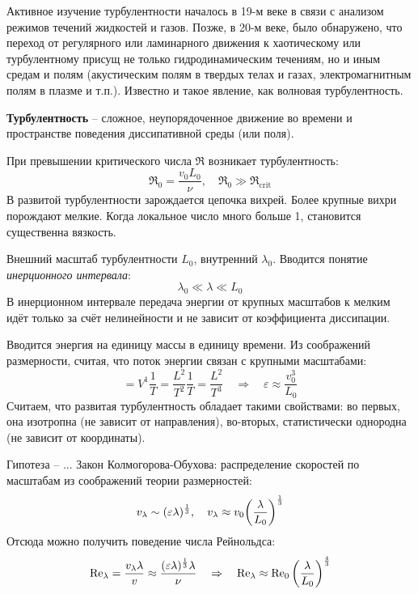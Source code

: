Активное изучение турбулентности началось в 19-м веке в связи с анализом режимов течений жидкостей и газов. Позже, в 20-м веке, было обнаружено, что переход от регулярного или ламинарного движения к хаотическому или турбулентному присущ не только гидродинамическим течениям, но и иным средам и полям (акустическим полям в твердых телах и газах, электромагнитным полям в плазме и т.п.). Известно и такое явление, как волновая турбулентность.

\textbf{Турбулентность} -- сложное, неупорядоченное движение 
во времени и пространстве поведения диссипативной среды (или поля).

При превышении критического числа $\Re$ возникает турбулентность:
\begin{equation}
    \Re_0 = \frac{v_0 L_0}{\nu}, \quad \Re_0 \gg \Re_\text{crit}
\end{equation}
В развитой турбулентности зарождается цепочка вихрей. Более крупные
вихри порождают мелкие. Когда локальное число много больше 1, 
становится существенна вязкость.

Внешний масштаб турбулентности $L_0$, внутренний $\lambda_0$.
Вводится понятие \textit{инерционного интервала}:
\begin{equation}
    \lambda_0 \ll \lambda \ll L_0
\end{equation}
В инерционном интервале передача энергии от крупных масштабов к
мелким идёт только за счёт нелинейности и не зависит от коэффициента
диссипации.

Вводится энергия на единицу массы в единицу времени. Из соображений
размерности, считая, что поток энергии связан с крупными масштабами:
\begin{equation}
    [\varepsilon] = V^1 \frac{1}{T} = \frac{L^2}{T^2}\frac{1}{T}=
    \frac{L^2}{T^3} 
    \quad\Rightarrow\quad 
    \varepsilon \approx \frac{v_0^3}{L_0}
\end{equation}
Считаем, что развитая турбулентность обладает такими свойствами:
во первых, она изотропна (не зависит от направления), во-вторых, 
статистически однородна (не зависит от координаты).

Гипотеза -- ...
Закон Колмогорова-Обухова: распределение скоростей по масштабам из
соображений теории размерностей:
\begin{equation}
    v_\lambda \sim (\varepsilon \lambda)^\frac{1}{3}, 
    \quad 
    v_\lambda \approx v_0 \qty(\frac{\lambda}{L_0})^\frac{1}{3}
\end{equation}
Отсюда можно получить поведение числа Рейнольдса:
\begin{equation}
    \Re_{\lambda} = \frac{v_\lambda \lambda}{v} \approx 
        \frac{(\varepsilon \lambda)^\frac{1}{3} \lambda}{\nu} 
        \quad\Rightarrow\quad 
        \Re_\lambda \approx \Re_0 \qty(\frac{\lambda}{L_0})^\frac{4}{3}
\end{equation}

